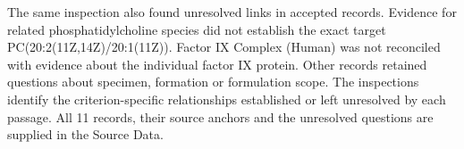 \documentclass[10pt]{article}
\begin{document}
The same inspection also found unresolved links in accepted records. Evidence for related phosphatidylcholine species did not establish the exact target PC(20:2(11Z,14Z)/20:1(11Z)). Factor IX Complex (Human) was not reconciled with evidence about the individual factor IX protein. Other records retained questions about specimen, formation or formulation scope. The inspections identify the criterion-specific relationships established or left unresolved by each passage. All 11 records, their source anchors and the unresolved questions are supplied in the Source Data.

\end{document}
